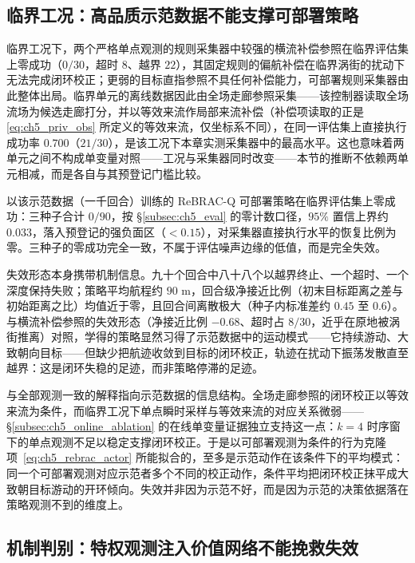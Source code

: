 \subsection{临界工况：高品质示范数据不能支撑可部署策略}\label{subsec:ch5_boundary_critical}

临界工况下，两个严格单点观测的规则采集器中较强的横流补偿参照在临界评估集上零成功（$0/30$，超时 $8$、越界 $22$），其固定规则的偏航补偿在临界涡街的扰动下无法完成闭环校正；更弱的目标直指参照不具任何补偿能力，可部署规则采集器由此整体出局。临界单元的离线数据因此由全场走廊参照采集——该控制器读取全场流场为候选走廊打分，并以等效来流作局部来流补偿（补偿项读取的正是 \eqref{eq:ch5_priv_obs} 所定义的等效来流，仅坐标系不同），在同一评估集上直接执行成功率 $0.700$（$21/30$），是该工况下本章实测采集器中的最高水平。这也意味着两单元之间不构成单变量对照——工况与采集器同时改变——本节的推断不依赖两单元相减，而是各自与其预登记门槛比较。

以该示范数据（一千回合）训练的 ReBRAC-Q 可部署策略在临界评估集上零成功：三种子合计 $0/90$，按 \S\ref{subsec:ch5_eval} 的零计数口径，$95\%$ 置信上界约 $0.033$，落入预登记的强负面区（$<0.15$），对采集器直接执行水平的恢复比例为零。三种子的零成功完全一致，不属于评估噪声边缘的低值，而是完全失效。

失效形态本身携带机制信息。九十个回合中八十八个以越界终止、一个超时、一个深度保持失败；策略平均航程约 $90$ m，回合级净接近比例（初末目标距离之差与初始距离之比）均值近于零，且回合间离散极大（种子内标准差约 $0.45$ 至 $0.6$）。与横流补偿参照的失效形态（净接近比例 $-0.68$、超时占 $8/30$，近乎在原地被涡街推离）对照，学得的策略显然习得了示范数据中的运动模式——它持续游动、大致朝向目标——但缺少把航迹收敛到目标的闭环校正，轨迹在扰动下振荡发散直至越界：这是闭环失稳的足迹，而非策略停滞的足迹。

与全部观测一致的解释指向示范数据的信息结构。全场走廊参照的闭环校正以等效来流为条件，而临界工况下单点瞬时采样与等效来流的对应关系微弱——\S\ref{subsec:ch5_online_ablation} 的在线单变量证据独立支持这一点：$k=4$ 时序窗下的单点观测不足以稳定支撑闭环校正。于是以可部署观测为条件的行为克隆项~\eqref{eq:ch5_rebrac_actor} 所能拟合的，至多是示范动作在该条件下的平均模式：同一个可部署观测对应示范者多个不同的校正动作，条件平均把闭环校正抹平成大致朝目标游动的开环倾向。失效并非因为示范不好，而是因为示范的决策依据落在策略观测不到的维度上。

\subsection{机制判别：特权观测注入价值网络不能挽救失效}\label{subsec:ch5_boundary_asym}

